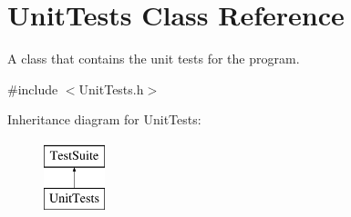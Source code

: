 \hypertarget{classUnitTests}{\section{Unit\-Tests Class Reference}
\label{classUnitTests}
}


A class that contains the unit tests for the program.  




{\ttfamily \#include $<$Unit\-Tests.\-h$>$}

Inheritance diagram for Unit\-Tests\-:\begin{figure}[H]
\begin{center}
\leavevmode
\includegraphics[height=2.000000cm]{classUnitTests}
\end{center}
\end{figure}

